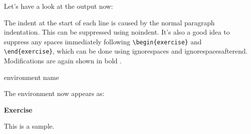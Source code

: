 Let's have a look at the output now:
\begin{result}
\end{result}
%
The indent at the start of each line is caused by the normal
paragraph indentation. This can be suppressed using \gls{noindent}.
It's also a good idea to suppress
any spaces immediately following \verb|\begin{exercise}| and \verb|\end{exercise}|, which can be done
using \gls{ignorespaces} and \reportlinebreak\screenlinebreak\gls{ignorespacesafterend}.
Modifications are again shown in bold .
\begin{code}\obeyspaces
{} environment name\newline
{}\newline
{}
\end{code}%
The  environment now appears as:
\begin{result}
\par\vspace{\baselineskip}\noindent
\textbf{Exercise}\begin{itshape}%
\par\vspace{\baselineskip}\noindent
This is a sample.
\end{itshape}
\end{result}

